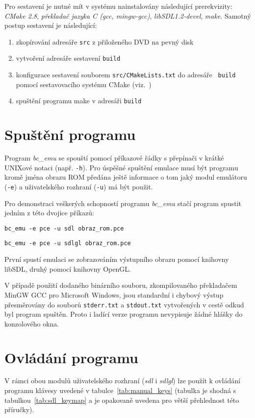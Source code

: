 \documentclass[11pt,oneside,a4paper]{book}
\begin{document}
Pro sestavení je nutné mít v systému nainstalovány následující prerekvizity:
{\em CMake 2.8}, {\em překladač jazyka C (gcc, mingw-gcc)}, {\em
libSDL1.2-devel}, {\em make}. Samotný postup sestavení je následující:

\begin{enumerate}
\item zkopírování adresáře {\tt src} z přiloženého DVD na pevný disk
\item vytvoření adresáře sestavení {\tt build}
\item konfigurace sestavení souborem {\tt src/CMakeLists.txt} do adresáře {\tt
	build} pomocí sestavovacího systému  CMake (viz.~\cite{wwwCMake})
\item spuštění programu make v adresáři {\tt build}
\end{enumerate}

\section{Spuštění programu}

Program {\em bc\_emu} se spouští pomocí příkazové řádky s přepínači v krátké
UNIXové notaci (např. {\tt -h}). Pro úspěšné spuštění emulace musí být
programu kromě jména obrazu ROM předána ještě informace o tom jaký modul
emulátoru ({\tt -e}) a uživatelského rozhraní ({\tt -u}) má být použit.

Pro demonstraci veškerých schopností programu {\em bc\_emu} stačí program
spustit jedním z této dvojice příkazů:

\noindent
{\tt bc\_emu -e pce -u sdl obraz\_rom.pce}

\noindent
{\tt bc\_emu -e pce -u sdlgl obraz\_rom.pce}

První spustí emulaci se zobrazováním výstupního obrazu pomocí knihovny libSDL,
druhý pomocí knihovny OpenGL.

V případě použití dodaného binárního souboru, zkompilovaného překladačem MinGW
GCC pro Microsoft Windows, jsou standardní i chybový výstup přesměrovány do
souborů {\tt stderr.txt} a {\tt stdout.txt} vytvořených v cestě odkud byl
program spuštěn. Proto i ladící verze programu nevypisuje žádné hlášky do
konzolového okna.

\section{Ovládání programu}

V rámci obou modulů uživatelského rozhraní ({\em sdl} i {\em sdlgl}) lze použít
k ovládání programu klávesy uvedené v tabulce~\ref{tab:manual_keys} (tabulka je
shodná s tabulkou~\ref{tab:sdl_keymap} a je opakovaně uvedena pro větší
přehlednost této příručky).
\end{document}
